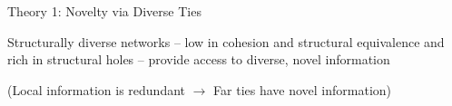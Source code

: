 \begin{frame}{{\color{violet}Theory 1: {\color{salmon}Novelty} via {\color{sred}Diverse} Ties}}

  \begin{center}
    Structurally {\color{sred}diverse} networks -- low in cohesion and structural equivalence and rich in structural holes -- provide access to diverse, {\color{salmon}novel} information
  \end{center}

  \vspace{2ex}
  \begin{center}
    \scriptsize (Local information is redundant $\rightarrow$ Far ties have novel information)
  \end{center}


\end{frame}
